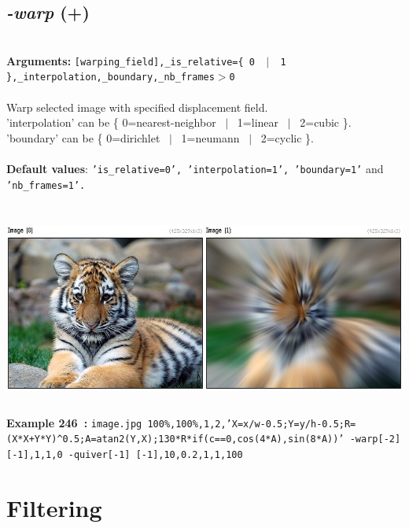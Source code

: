 \documentclass[a4paper,11pt,twoside]{book}
\begin{document}
\subsection{\emph{-warp} (+)}\vspace*{-0.5em}
~\\\textbf{Arguments: } 
{\small \texttt{[warping\_field],\_is\_relative=\{ 0 ~$|$~ 1 \},\_interpolation,\_boundary,\_nb\_frames$>$0}}\\~\\
Warp selected image with specified displacement field.
~\\'interpolation' can be \{ 0=nearest-neighbor ~$|$~ 1=linear ~$|$~ 2=cubic \}.
~\\'boundary' can be \{ 0=dirichlet ~$|$~ 1=neumann ~$|$~ 2=cyclic \}.
~\\~\\\textbf{Default values}: {\small \texttt{'is\_relative=0', 'interpolation=1', 'boundary=1'} and \texttt{'nb\_frames=1'.}}
\begin{center}\includegraphics[keepaspectratio=true,height=7cm,width=\textwidth]{img/gmic_def246.jpg}\\
{\footnotesize \textbf{Example 246~:} \texttt{image.jpg 100\%,100\%,1,2,'X=x/w-0.5;Y=y/h-0.5;R=(X*X+Y*Y)\textasciicircum 0.5;A=atan2(Y,X);130*R*if(c==0,cos(4*A),sin(8*A))' -warp[-2] [-1],1,1,0 -quiver[-1] [-1],10,0.2,1,1,100}}
\end{center}
\section{Filtering}
\end{document}
